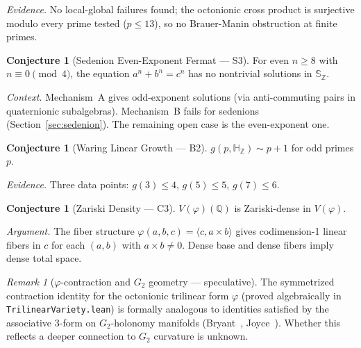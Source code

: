 \documentclass[11pt]{amsart}
\theoremstyle{plain}
\theoremstyle{definition}
\newtheorem{conjecture}[theorem]{Conjecture}
\theoremstyle{remark}
\newtheorem{remark}[theorem]{Remark}
\newcommand{\Z}{\mathbb{Z}}
\newcommand{\Q}{\mathbb{Q}}
\newcommand{\HH}{\mathbb{H}}
\newcommand{\Se}{\mathbb{S}}
\begin{document}
\noindent
\emph{Evidence.} No local-global failures found; the octonionic cross product
is surjective modulo every prime tested ($p \leq 13$),
so no Brauer-Manin obstruction at finite primes.

\begin{conjecture}[Sedenion Even-Exponent Fermat --- S3]\label{conj:sedenion}
For even $n \geq 8$ with $n \equiv 0 \pmod{4}$, the equation
$a^n + b^n = c^n$ has no nontrivial solutions in $\Se_\Z$.
\end{conjecture}

\noindent
\emph{Context.} Mechanism~A gives odd-exponent solutions (via anti-commuting pairs
in quaternionic subalgebras). Mechanism~B fails for sedenions
(Section~\ref{sec:sedenion}). The remaining open case is the even-exponent one.

\begin{conjecture}[Waring Linear Growth --- B2]\label{conj:waringlinear}
$g(p, \HH_\Z) \sim p + 1$ for odd primes $p$.
\end{conjecture}

\noindent
\emph{Evidence.} Three data points: $g(3) \leq 4$, $g(5) \leq 5$, $g(7) \leq 6$.

\begin{conjecture}[Zariski Density --- C3]\label{conj:zariski}
$V(\varphi)(\Q)$ is Zariski-dense in $V(\varphi)$.
\end{conjecture}

\noindent
\emph{Argument.} The fiber structure $\varphi(a, b, c) = \langle c, a \times b \rangle$
gives codimension-1 linear fibers in $c$ for each $(a, b)$ with $a \times b \neq 0$.
Dense base and dense fibers imply dense total space.

\begin{remark}[$\varphi$-contraction and $G_2$ geometry --- speculative]
The symmetrized contraction identity for the octonionic trilinear form $\varphi$
(proved algebraically in \texttt{TrilinearVariety.lean})
is formally analogous to identities satisfied by the associative 3-form
on $G_2$-holonomy manifolds (Bryant~\cite{Bryant1987}, Joyce~\cite{Joyce2000}).
Whether this reflects a deeper connection to $G_2$ curvature is unknown.
\end{remark}

\end{document}
